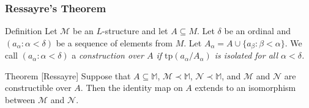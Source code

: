 \begin{frame}[c]\frametitle{Ressayre's Theorem}
    
	\begin{beamerboxesrounded}[shadow=true]{Definition}
		Let $\mathcal{M}$ be an $L$-structure and let $A\subseteq M$.
		Let $\delta$ be an ordinal and \break $(a_\alpha : \alpha < \delta)$ be a sequence of elements from $M$.
		Let $A_\alpha = A \cup \{a_\beta : \beta < \alpha \}$. 
		We call $(a_\alpha : \alpha < \delta)$ a \em construction \em over $A$ if $\text{tp}(a_\alpha / A_\alpha)$ is isolated for all $\alpha < \delta$.
	\end{beamerboxesrounded}

	\begin{beamerboxesrounded}[shadow=true]{Theorem [Ressayre]}
		Suppose that $A \subseteq \mathbb{M}$, $\mathcal{M}\prec \mathbb{M}$, $\mathcal{N}\prec \mathbb{M}$, and $\mathcal{M}$ and $\mathcal{N}$ are constructible over $A$.
		Then the identity map on $A$ extends to an isomorphism between $\mathcal{M}$ and $\mathcal{N}$.
	\end{beamerboxesrounded}

\end{frame}

